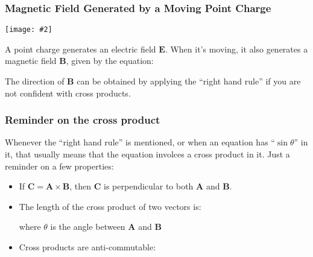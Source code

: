 \documentclass[12pt,aspectratio=169]{beamer}
\newcommand{\pic}[2]{\texttt{[image: \#2]}}
\newcommand{\mb}[1]{\mathbf{#1}}
\newcommand{\eq}[2]{\vspace{#1}{\Large\begin{displaymath}#2\end{displaymath}}}
\begin{document}
\begin{frame}
  \frametitle{Magnetic Field Generated by a Moving Point Charge}
  \begin{center}
    \pic{.35}{pointchargeB.png}
  \end{center}
  
  A point charge generates an electric field $\mb{E}$. When it's moving, it
  also generates a magnetic field $\mb{B}$, given by the equation:

  \eq{-.2in}{
    \boxed{\mb{B}=\frac{\mu_o}{4\pi}\frac{q\mb{v}\times\hat{\mb{r}}}{r^2}}
  }

  The direction of $\mb{B}$ can be obtained by applying the ``right hand rule''
  if you are not confident with cross products.
\end{frame}

\begin{frame}
  \frametitle{Reminder on the cross product}
  Whenever the ``right hand rule'' is mentioned, or when an equation has
  ``$\sin\theta$'' in it, that usually means that the equation involces a
  cross product in it. Just a reminder on a few properties:
  \begin{itemize}
  \item If $\mb{C}=\mb{A}\times\mb{B}$, then $\mb{C}$ is perpendicular to both
    $\mb{A}$ and $\mb{B}$.
  \item The length of the cross product of two vectors is:
    
    \eq{-.3in}{
      |\mb{A}\times\mb{B}|=|\mb{A}||\mb{B}|\sin\theta
    }
    where $\theta$ is the angle between $\mb{A}$ and $\mb{B}$
  \item Cross products are anti-commutable:

    \eq{-.35in}{
      \mb{A}\times\mb{B}=-\mb{B}\times\mb{A}
    }
  \end{itemize}
\end{frame}
\end{document}

